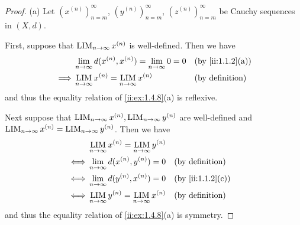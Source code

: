 \begin{proof}{(a)}
  Let \((x^{(n)})_{n = m}^\infty\), \((y^{(n)})_{n = m}^\infty\), \((z^{(n)})_{n = m}^\infty\) be Cauchy sequences in \((X, d)\).

  First, suppose that \(\operatorname*{LIM}_{n \to \infty} x^{(n)}\) is well-defined.
  Then we have
  \begin{align*}
             & \lim_{n \to \infty} d(x^{(n)}, x^{(n)}) = \lim_{n \to \infty} 0 = 0 &  & \by{ii:1.1.2}[a]       \\
    \implies & \LIM_{n \to \infty} x^{(n)} = \LIM_{n \to \infty} x^{(n)}           &  & \text{(by definition)}
  \end{align*}
  and thus the equality relation of \cref{ii:ex:1.4.8}(a) is reflexive.

  Next suppose that \(\operatorname*{LIM}_{n \to \infty} x^{(n)}, \operatorname*{LIM}_{n \to \infty} y^{(n)}\) are well-defined and \(\operatorname*{LIM}_{n \to \infty} x^{(n)} = \operatorname*{LIM}_{n \to \infty} y^{(n)}\).
  Then we have
  \begin{align*}
         & \LIM_{n \to \infty} x^{(n)} = \LIM_{n \to \infty} y^{(n)}                             \\
    \iff & \lim_{n \to \infty} d(x^{(n)}, y^{(n)}) = 0               &  & \text{(by definition)} \\
    \iff & \lim_{n \to \infty} d(y^{(n)}, x^{(n)}) = 0               &  & \by{ii:1.1.2}[c]       \\
    \iff & \LIM_{n \to \infty} y^{(n)} = \LIM_{n \to \infty} x^{(n)} &  & \text{(by definition)}
  \end{align*}
  and thus the equality relation of \cref{ii:ex:1.4.8}(a) is symmetry.


\end{proof}
